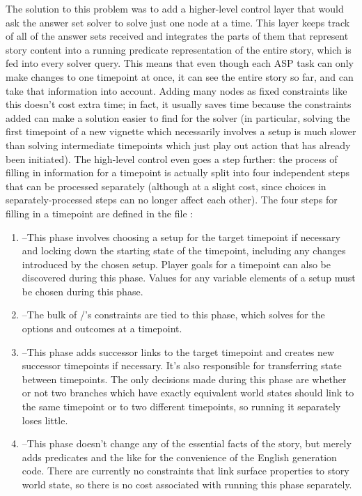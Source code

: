 The solution to this problem was to add a higher-level control layer that would ask the answer set solver to solve just one node at a time.
%
This layer keeps track of all of the answer sets received and integrates the parts of them that represent story content into a running predicate representation of the entire story, which is fed into every solver query.
%
This means that even though each ASP task can only make changes to one timepoint at once, it can see the entire story so far, and can take that information into account.
%
Adding many nodes as fixed constraints like this doesn't cost extra time; in fact, it usually saves time because the constraints added can make a solution easier to find for the solver (in particular, solving the first timepoint of a new vignette which necessarily involves a setup is much slower than solving intermediate timepoints which just play out action that has already been initiated).
%
The high-level control even goes a step further: the process of filling in information for a timepoint is actually split into four independent steps that can be processed separately (although at a slight cost, since choices in separately-processed steps can no longer affect each other).
%
The four steps for filling in a timepoint are defined in the file :
\begin{enumerate}
  \item {}--This phase involves choosing a setup for the target timepoint if necessary and locking down the starting state of the timepoint, including any changes introduced by the chosen setup. Player goals for a timepoint can also be discovered during this phase. Values for any variable elements of a setup must be chosen during this phase.
  \item {}--The bulk of \dunyazad/'s constraints are tied to this phase, which solves for the options and outcomes at a timepoint.
  \item {}--This phase adds successor links to the target timepoint and creates new successor timepoints if necessary. It's also responsible for transferring state between timepoints. The only decisions made during this phase are whether or not two branches which have exactly equivalent world states should link to the same timepoint or to two different timepoints, so running it separately loses little.
  \item {}--This phase doesn't change any of the essential facts of the story, but merely adds  predicates and the like for the convenience of the English generation code. There are currently no constraints that link surface properties to story world state, so there is no cost associated with running this phase separately.
\end{enumerate}

